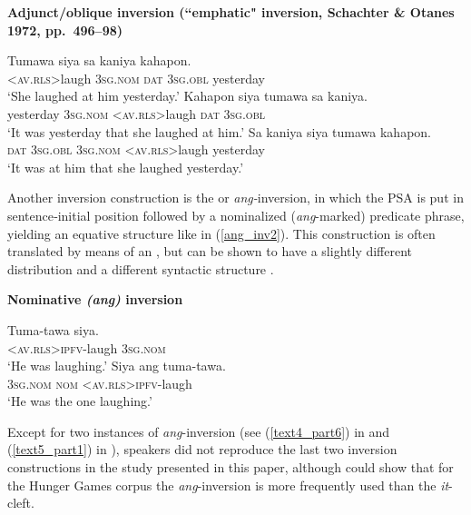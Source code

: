 \documentclass[output=paper,
,modfonts
,nonflat]{langsci/langscibook}
\begin{document}
\begin{exe}
\ex\label{adj_inv_1} \textbf{Adjunct/oblique inversion (``emphatic" inversion, Schachter \& Otanes 1972, pp.\ 496--98)}
\begin{xlist}
\ex
\gll T{\USSmaller}um{\USGreater}awa    siya    sa kaniya      kahapon.\\
     <\textsc{av.rls}>laugh   \textsc{3sg.nom}  \textsc{dat} \textsc{3sg.obl} yesterday\\
\glt `She laughed at him yesterday.'
\ex
\gll Kahapon    siya    t{\USSmaller}um{\USGreater}awa    sa kaniya.\\   
yesterday    \textsc{3sg.nom}    <\textsc{av.rls}>laugh   \textsc{dat} \textsc{3sg.obl}\\  
\glt `It was yesterday that she laughed at him.'
\ex
\gll Sa kaniya    siya        t{\USSmaller}um{\USGreater}awa        kahapon.\\
     \textsc{dat} \textsc{3sg.obl}    \textsc{3sg.nom}    <\textsc{av.rls}>laugh    yesterday\\
\glt `It was at him that she laughed yesterday.'
\end{xlist}
\end{exe}

\noindent Another inversion construction is the  or \textit{ang-}inversion, in which the PSA is put in sentence‐initial position followed by a nominalized (\textit{ang}-marked) predicate phrase, yielding an equative structure like in (\ref{ang_inv2}). This construction is often translated by means of an  , but can be shown to have a slightly different distribution \citep{latan16c} and a different syntactic structure \citep[e.g.][]{nagna07a}.

\begin{exe}
\ex\label{nom_inv1} \textbf{Nominative \textit{(ang)} inversion}
\begin{xlist}
\ex
\gll T{\USSmaller}um{\USGreater}a-tawa     siya.\\
     \textsc{<av.rls>ipfv}-laugh  \textsc{3sg.nom}\\
\glt `He was laughing.'
\ex\label{ang_inv2}
\gll Siya         ang     t{\USSmaller}um{\USGreater}a-tawa.\\
     \textsc{3sg.nom} \textsc{nom} \textsc{<av.rls>ipfv}-laugh\\
\glt `He was the one laughing.'
\end{xlist}
\end{exe}

\noindent Except for two instances of \textit{ang}-inversion (see (\ref{text4_part6}) in  and (\ref{text5_part1}) in ), speakers did not reproduce the last two inversion constructions in the study presented in this paper, although \cite{latan16c}
could show that for the Hunger Games corpus the \textit{ang}-inversion is more frequently used than the  \textit{it}-cleft.
\end{document}
